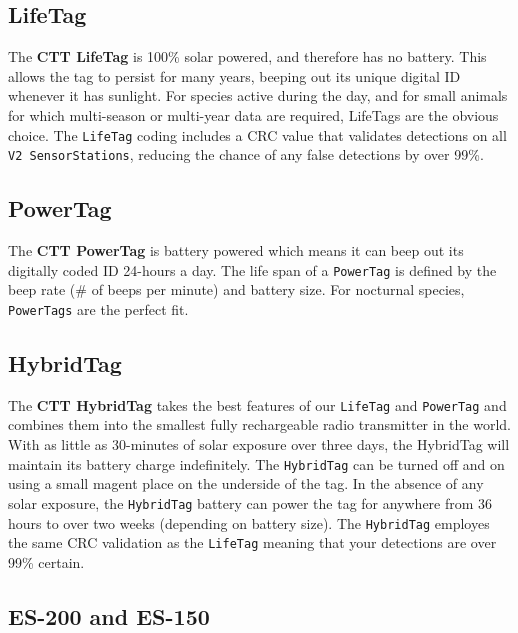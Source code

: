 \documentclass[
]{article}
\begin{document}
\hypertarget{lifetag}{%
\subsection{LifeTag}\label{lifetag}}

The \textbf{CTT LifeTag} is 100\% solar powered, and therefore has no
battery. This allows the tag to persist for many years, beeping out its
unique digital ID whenever it has sunlight. For species active during
the day, and for small animals for which multi-season or multi-year data
are required, LifeTags are the obvious choice. The \texttt{LifeTag}
coding includes a CRC value that validates detections on all
\texttt{V2\ SensorStations}, reducing the chance of any false detections
by over 99\%.

\hypertarget{powertag}{%
\subsection{PowerTag}\label{powertag}}

The \textbf{CTT PowerTag} is battery powered which means it can beep out
its digitally coded ID 24-hours a day. The life span of a
\texttt{PowerTag} is defined by the beep rate (\# of beeps per minute)
and battery size. For nocturnal species, \texttt{PowerTags} are the
perfect fit.

\hypertarget{hybridtag}{%
\subsection{HybridTag}\label{hybridtag}}

The \textbf{CTT HybridTag} takes the best features of our
\texttt{LifeTag} and \texttt{PowerTag} and combines them into the
smallest fully rechargeable radio transmitter in the world. With as
little as 30-minutes of solar exposure over three days, the HybridTag
will maintain its battery charge indefinitely. The \texttt{HybridTag}
can be turned off and on using a small magent place on the underside of
the tag. In the absence of any solar exposure, the \texttt{HybridTag}
battery can power the tag for anywhere from 36 hours to over two weeks
(depending on battery size). The \texttt{HybridTag} employes the same
CRC validation as the \texttt{LifeTag} meaning that your detections are
over 99\% certain.

\hypertarget{es-200-and-es-150}{%
\subsection{ES-200 and ES-150}\label{es-200-and-es-150}}
\end{document}
